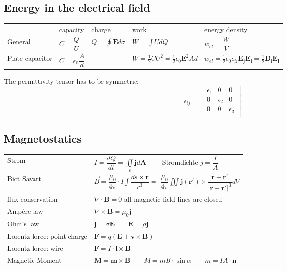 	\subsection{Energy in the electrical field}
		{\def \arraystretch{2}	
	\begin{tabularx}{\columnwidth}{lllXX}
		&capacity & charge & work&energy density\\
		General & $C = \dfrac{Q}{U}$ & $Q = \oint\mathbf{E}d\sigma$ & $W = \int U dQ$& $w_{el} = \dfrac{W}{V}$\\
		Plate capacitor & $C = \epsilon_0\dfrac{A}{d}$ & &$W = \frac{1}{2}CU^2 = \frac{1}{2}\epsilon_0 \mathbf{E}^2A d $ & $w_{el}= \frac{1}{2}\epsilon_0\epsilon_{ij}\mathbf{E_j E_i}= \frac{1}{2}\mathbf{D_i E_i}$\\

		
	\end{tabularx}
	
		The permittivity tensor has to be symmetric: 
		$$
		\epsilon_{ij} = \begin{bmatrix}
		\epsilon_1 & 0 & 0 \\ 0 & \epsilon_2 & 0 \\ 0 & 0 & \epsilon_3 \\
		\end{bmatrix}
		$$ 

		\subsection{Magnetostatics}

		\begin{tabularx}{\columnwidth}{p{3cm}X}
		Strom       & $I = \dfrac{dQ}{dt} = \iint\limits_\epsilon \bm j d\bm A \qquad $ Stromdichte $j = \dfrac{I}{A}$\\
			
		Biot Savart & $\vec B = \dfrac{\mu_0}{4\pi}\cdot I \int \dfrac{ds\times \mathbf{r}}{r^3} = $
		$\dfrac{\mu_0}{4\pi}\iiint \bm j(\bm r') \times \dfrac{\bm r - \bm r'}{|\bm r - \bm r'|^3}dV$ \\
		flux conservation & $\nabla\cdot \mathbf{B} = 0$ all  magnetic field lines are closed\\
		Ampère law	& $\nabla\times \mathbf{B} = \mu_0 \mathbf{j}$\\
		Ohm's law			&$\bm j = \sigma \bm E\qquad \bm E =  \rho \bm j$\\
					 
		Lorentz force: point charge & $\mathbf{F} = q(\mathbf{E+v\times B})	$\\
		Lorentz force: wire  & $\bm F = I\cdot \bm l \times \bm B$\\
		
		Magnetic Moment& $\bm M = \bm m  \times \bm B \qquad  M = m  B \cdot \sin\alpha \qquad m = I A\cdot \bm n$\\
 		\end{tabularx}
	}
